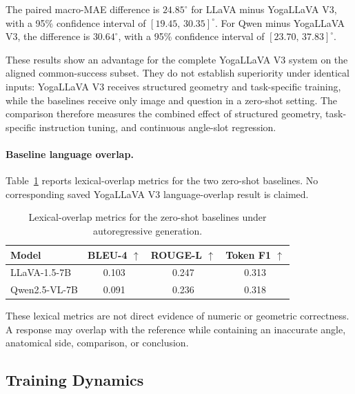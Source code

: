 The paired macro-MAE difference is $24.85^\circ$ for
LLaVA minus YogaLLaVA V3, with a 95\% confidence interval of
$[19.45,\,30.35]^\circ$. For Qwen minus YogaLLaVA V3, the difference is
$30.64^\circ$, with a 95\% confidence interval of
$[23.70,\,37.83]^\circ$.

These results show an advantage for the complete YogaLLaVA V3 system
on the aligned common-success subset. They do not establish superiority
under identical inputs: YogaLLaVA V3 receives structured geometry and
task-specific training, while the baselines receive only image and
question in a zero-shot setting. The comparison therefore measures the
combined effect of structured geometry, task-specific instruction
tuning, and continuous angle-slot regression.

\paragraph{Baseline language overlap.}
Table~\ref{tab:baseline_language_results} reports lexical-overlap
metrics for the two zero-shot baselines. No corresponding saved
YogaLLaVA V3 language-overlap result is claimed.

\begin{table}[t]
    \centering
    \caption{Lexical-overlap metrics for the zero-shot baselines under
autoregressive generation.}
    \label{tab:baseline_language_results}
    \begin{tabular}{lccc}
        \toprule
        \textbf{Model} &
        \textbf{BLEU-4 $\uparrow$} &
        \textbf{ROUGE-L $\uparrow$} &
        \textbf{Token F1 $\uparrow$} \\
        \midrule
        LLaVA-1.5-7B & 0.103 & 0.247 & 0.313 \\
        Qwen2.5-VL-7B & 0.091 & 0.236 & 0.318 \\
        \bottomrule
    \end{tabular}
\end{table}

These lexical metrics are not direct evidence of numeric or geometric
correctness. A response may overlap with the reference while containing
an inaccurate angle, anatomical side, comparison, or conclusion.

\subsection{Training Dynamics}
\label{sec:training_dynamics}

